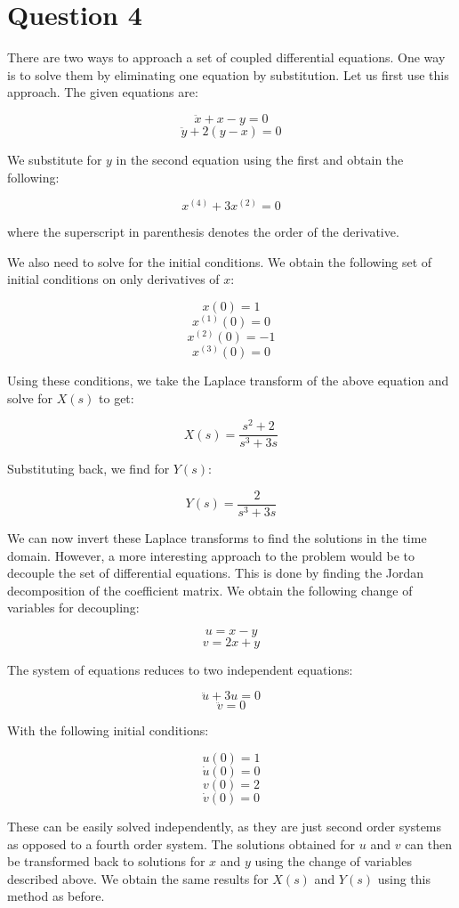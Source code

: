 \documentclass[11pt]{article}
\begin{document}
	

	
		
    \section{Question 4}\label{question-4}

There are two ways to approach a set of coupled differential equations.
One way is to solve them by eliminating one equation by substitution.
Let us first use this approach. The given equations are:

\[\ddot{x} + x -y = 0\] \[\ddot{y} + 2(y -x) = 0\]

We substitute for \(y\) in the second equation using the first and
obtain the following:

\[x^{(4)} + 3x^{(2)} = 0\]

where the superscript in parenthesis denotes the order of the
derivative.

We also need to solve for the initial conditions. We obtain the
following set of initial conditions on only derivatives of \(x\):

\[x(0) = 1\] \[x^{(1)}(0) = 0\] \[x^{(2)}(0) = -1\] \[x^{(3)}(0) = 0\]

Using these conditions, we take the Laplace transform of the above
equation and solve for \(X(s)\) to get:

\[X(s) = \frac{s^2+2}{s^3+3s}\]

Substituting back, we find for \(Y(s)\):

\[Y(s) = \frac{2}{s^3+3s}\]

We can now invert these Laplace transforms to find the solutions in the
time domain. However, a more interesting approach to the problem would
be to decouple the set of differential equations. This is done by
finding the Jordan decomposition of the coefficient matrix. We obtain
the following change of variables for decoupling:

\[u = x-y\] \[v = 2x+y\]

The system of equations reduces to two independent equations:

\[\ddot{u} + 3u = 0\] \[\ddot{v} = 0\]

With the following initial conditions:

\[u(0) = 1\] \[\dot{u}(0) = 0\] \[v(0) = 2\] \[\dot{v}(0) = 0\]

These can be easily solved independently, as they are just second order
systems as opposed to a fourth order system. The solutions obtained for
\(u\) and \(v\) can then be transformed back to solutions for \(x\) and
\(y\) using the change of variables described above. We obtain the same
results for \(X(s)\) and \(Y(s)\) using this method as before.
\end{document}
